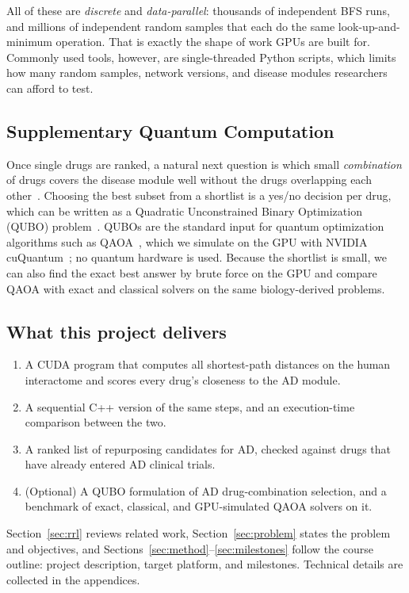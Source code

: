All of these are \emph{discrete} and \emph{data-parallel}: thousands of independent BFS runs, and millions of independent random samples that each do the same look-up-and-minimum operation. That is exactly the shape of work GPUs are built for. Commonly used tools, however, are single-threaded Python scripts, which limits how many random samples, network versions, and disease modules researchers can afford to test.

\subsection{Supplementary Quantum Computation}

Once single drugs are ranked, a natural next question is which small \emph{combination} of drugs covers the disease module well without the drugs overlapping each other~\cite{cheng2019network}. Choosing the best subset from a shortlist is a yes/no decision per drug, which can be written as a Quadratic Unconstrained Binary Optimization (QUBO) problem~\cite{glover2019tutorial,lucas2014ising}. QUBOs are the standard input for quantum optimization algorithms such as QAOA~\cite{farhi2014qaoa}, which we simulate on the GPU with NVIDIA cuQuantum~\cite{bayraktar2023cuquantum}; no quantum hardware is used. Because the shortlist is small, we can also find the exact best answer by brute force on the GPU and compare QAOA with exact and classical solvers on the same biology-derived problems.

\subsection{What this project delivers}

\begin{enumerate}[nosep]
  \item A CUDA program that computes all shortest-path distances on the human
        interactome and scores every drug's closeness to the AD module.
  \item A sequential C++ version of the same steps, and an
        execution-time comparison between the two.
  \item A ranked list of repurposing candidates for AD, checked against drugs
        that have already entered AD clinical trials.
  \item (Optional) A QUBO formulation of AD drug-combination selection, and a
        benchmark of exact, classical, and GPU-simulated QAOA solvers on it.
\end{enumerate}

Section~\ref{sec:rrl} reviews related work, Section~\ref{sec:problem} states the problem and objectives, and Sections~\ref{sec:method}--\ref{sec:milestones} follow the course outline: project description, target platform, and milestones. Technical details are collected in the appendices.

